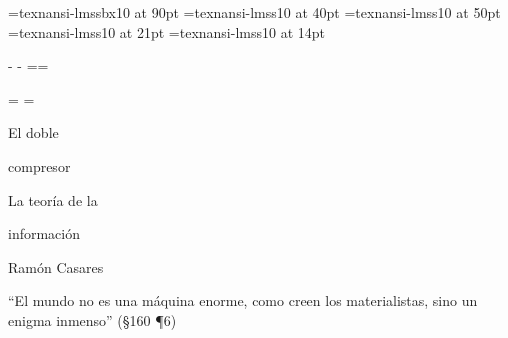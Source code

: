 
\font\titlefont=texnansi-lmssbx10 at 90pt
\font\subtitlefont=texnansi-lmss10 at 40pt
\font\authorfont=texnansi-lmss10 at 50pt
\font\citafont=texnansi-lmss10 at 21pt
\font\textfont=texnansi-lmss10 at 14pt

\ansifont

\def\pdfRed{\pdfliteral{0 1 1 0 k}}
\def\pdfBlack{\pdfliteral{0 0 0 1 k}}
\def\pdfWhite{\pdfliteral{0 0 0 0 k}}

\topskip=10bp
\newdimen\hpage
\hpage=6in \hsize=5.5in
 \hoffset\hpage \advance\hoffset-\hsize
 \divide{} \advance\hoffset-1in
\newdimen\vpage
\vpage=9in \vsize=8.5in
 \voffset\vpage \advance\voffset-\vsize
 \divide{} \advance\voffset-1in
\pdfpageheight=\vpage \pdfpagewidth=\hpage

\def\makeheadline{\vbox to0pt{\line{\the\headline}\vss}\nointerlineskip}

\headline={%
 \hfil}
\footline={\hfil}


\pdfWhite
\hbox{}
\vskip2.5in
\centerline{\titlefont El doble}
\vskip1pc
\centerline{\titlefont compresor}

\vskip10pc
\centerline{\subtitlefont La teoría de la}
\vskip6pt
\centerline{\subtitlefont información}

\vskip2pc
\centerline{\authorfont Ramón Casares}

\vfil\break


\pdfWhite

\hbox{}
\begingroup\citafont\parindent=0pt\baselineskip=24pt\obeylines

``El mundo no es una máquina enorme,
\leavevmode\kern12pt como creen los materialistas,
\leavevmode\kern12pt sino un enigma inmenso'' {\textfont(§160 ¶6)}

\endgroup

\vskip 1pc

\begingroup\textfont\parindent=0pt\baselineskip=16pt\obeylines

